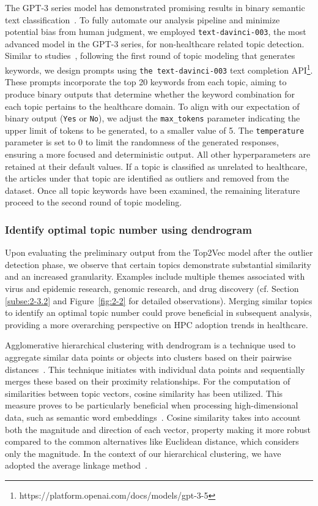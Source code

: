The GPT-3 series model has demonstrated promising results in binary semantic text classification~\cite{zografos2023gpt}. To fully automate our analysis pipeline and minimize potential bias from human judgment, we employed \texttt{text-davinci-003}, the most advanced model in the GPT-3 series, for non-healthcare related topic detection. Similar to studies~\cite{carpenter2023using,bommarito2022gpt}, following the first round of topic modeling that generates keywords, we design prompts using \texttt{the text-davinci-003} text completion API\footnote[2]{https://platform.openai.com/docs/models/gpt-3-5}. These prompts incorporate the top 20 keywords from each topic, aiming to produce binary outputs that determine whether the keyword combination for each topic pertains to the healthcare domain. To align with our expectation of binary output (\texttt{Yes} or \texttt{No}), we adjust the \texttt{max\_tokens} parameter indicating the upper limit of tokens to be generated, to a smaller value of 5. The \texttt{temperature}  parameter is set to 0 to limit the randomness of the generated responses, ensuring a more focused and deterministic output.  All other hyperparameters are retained at their default values. If a topic is classified as unrelated to healthcare, the articles under that topic are identified as outliers and removed from the dataset. Once all topic keywords have been examined, the remaining literature proceed to the second round of topic modeling.

\subsubsection{Identify optimal topic number using dendrogram}\label{subsubse:2-2.3.3}

Upon evaluating the preliminary output from the Top2Vec model after the outlier detection phase, we observe that certain topics demonstrate substantial similarity and an increased granularity. Examples include multiple themes associated with virus and epidemic research, genomic research, and drug discovery (cf. Section \ref{subse:2-3.2} and Figure~\ref{fig:2-2} for detailed observations). Merging similar topics to identify an optimal topic number could prove beneficial in subsequent analysis, providing a more overarching perspective on HPC adoption trends in healthcare.

Agglomerative hierarchical clustering with dendrogram is a technique used to aggregate similar data points or objects into clusters based on their pairwise distances~\cite{nielsen2016hierarchical}. This technique initiates with individual data points and sequentially merges these based on their proximity relationships. For the computation of similarities between topic vectors, cosine similarity has been utilized. This measure proves to be particularly beneficial when processing high-dimensional data, such as semantic word embeddings~\cite{orkphol2019word,rozado2019using}. Cosine similarity takes into account both the magnitude and direction of each vector, property making it more robust compared to the common alternatives like Euclidean distance, which considers only the magnitude. In the context of our hierarchical clustering, we have adopted the average linkage method~\cite{nielsen2016hierarchical}.

